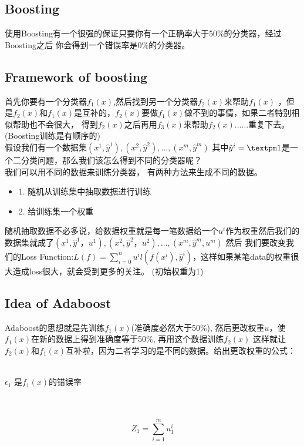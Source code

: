 \subsection{Boosting}
使用Boosting有一个很强的保证只要你有一个正确率大于50\%的分类器，经过Boosting之后
你会得到一个错误率是0\%的分类器。

\subsection{Framework of boosting}
首先你要有一个分类器$f_1(x)$,然后找到另一个分类器$f_2(x)$来帮助$f_1(x)$
，但是$f_2(x)$和$f_1(x)$是互补的，$f_2(x)$要做$f_1(x)$做不到的事情，如果二者特别相似帮助也不会很大，
得到$f_2(x)$之后再用$f_3(x)$来帮助$f_2(x)$......重复下去。
(Boosting训练是有顺序的)
\\
假设我们有一个数据集{{${(x^1, \hat{y}^1), (x^2, \hat{y}^2), ..., (x^m, \hat{y}^m)}$}} 
其中$\hat{y}^i = \textpm 1$是一个二分类问题，那么我们该怎么得到不同的分类器呢？\\
我们可以用不同的数据来训练分类器， 有两种方法来生成不同的数据。

\begin{itemize}
    \item 1. 随机从训练集中抽取数据进行训练
    \item 2. 给训练集一个权重
\end{itemize}


随机抽取数据不必多说，给数据权重就是每一笔数据给一个$u^i$作为权重然后我们的数据集就成了{{${(x^1, \hat{y}^1，u^1), (x^2, \hat{y}^2， u^2), ..., (x^m, \hat{y}^m, u^m)}$}}
然后 我们要改变我们的Loss Function:$L(f) = \sum_{i=0}^{n}u^il(f(x^i), \hat{y}^i)$，这样如果某笔data的权重很大造成loss很大，就会受到更多的关注。
(初始权重为1)
\subsection{Idea of Adaboost}
Adaboost的思想就是先训练$f_1(x)$(准确度必然大于50\%), 然后更改权重$u$，使$f_1(x)$在新的数据上得到准确度等于50\%, 再用这个数据训练$f_2(x)$
这样就让$f_2(x)$和$f_1(x)$互补啦，因为二者学习的是不同的数据。给出更改权重的公式：\\\\
\centerline{${\epsilon}_1$ 是$f_1(x)$的错误率}\\\\

\begin{equation*}
    Z_1 = \sum_{i=1}^m u_1^i
\end{equation*}

